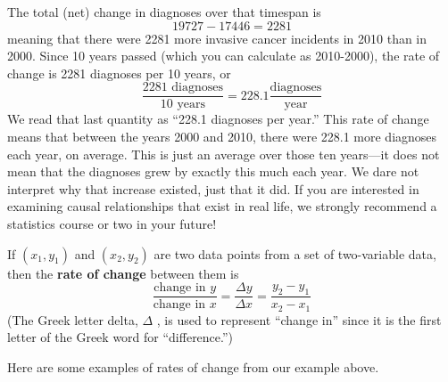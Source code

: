 \documentclass{ximera}
\begin{document}
\begin{example}
\begin{explanation}
The total (net) change in diagnoses over that timespan is
$$19727-17446=2281$$
meaning that there were 2281 more invasive cancer incidents in 2010 than in 2000. Since 10 years passed (which you can calculate as 2010-2000), the rate of change is 2281 diagnoses per 10 years, or
$$\frac{2281 \text{ diagnoses}}{10 \text{ years}} = 228.1 \frac{\text{diagnoses}}{\text{year}}$$
We read that last quantity as “228.1 diagnoses per year.” This rate of change means that between the years 2000 and 2010, there were 228.1 more diagnoses each year, on average. This is just an average over those ten years—it does not mean that the diagnoses grew by exactly this much each year.  We dare not interpret why that increase existed,  just that it did.  If you are interested in examining causal relationships that exist in real life,  we strongly recommend a statistics course or two in your future!
\end{explanation}
\end{example}

\begin{tcolorbox}
\begin{definition} 
 If $(x_1,y_1)$ and $(x_2,y_2)$ are two data points from a set of two-variable data, then the \textbf{rate of change} between them is
$$ \frac{\text{change in } y}{\text{change in } x} = \frac{\Delta y}{\Delta x} = \frac{y_2-y_1}{x_2-x_1}$$
(The Greek letter delta, $\Delta$ , is used to represent “change in” since it is the first letter of the Greek word for “difference.”)
\end{definition}
\end{tcolorbox}

Here are some examples of rates of change from our example above.
\end{document}
